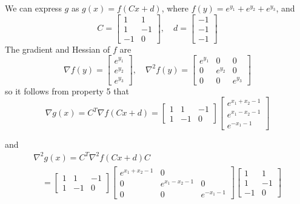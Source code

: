 \begin{example}
We can express $ g $ as $ g(x)=f(C x+d) $, where $ f(y)=e^{y_{1}}+e^{y_{2}}+e^{y_{3}} $, and
\begin{equation}
C=\left[\begin{array}{rr}
1 & 1 \\
1 & -1 \\
-1 & 0
\end{array}\right], \quad d=\left[\begin{array}{l}
-1 \\
-1 \\
-1
\end{array}\right]
\end{equation}
The gradient and Hessian of $ f $ are
\begin{equation}
\nabla f(y)=\left[\begin{array}{c}
e^{y_{1}} \\
e^{y_{2}} \\
e^{y_{3}}
\end{array}\right], \quad \nabla^{2} f(y)=\left[\begin{array}{ccc}
e^{y_{1}} & 0 & 0 \\
0 & e^{y_{2}} & 0 \\
0 & 0 & e^{y_{3}}
\end{array}\right]
\end{equation}
so it follows from property 5 that
\begin{equation}
\nabla g(x)=C^{T} \nabla f(C x+d)=\left[\begin{array}{rrr}
1 & 1 & -1 \\
1 & -1 & 0
\end{array}\right]\left[\begin{array}{c}
e^{x_{1}+x_{2}-1} \\
e^{x_{1}-x_{2}-1} \\
e^{-x_{1}-1}
\end{array}\right]
\end{equation}

and
\begin{equation}
\begin{array}{l}
\nabla^{2} g(x)=C^{T} \nabla^{2} f(C x+d) C \\
\quad=\left[\begin{array}{rrr}
1 & 1 & -1 \\
1 & -1 & 0
\end{array}\right]\left[\begin{array}{ccc}
e^{x_{1}+x_{2}-1} & 0 & \\
0 & e^{x_{1}-x_{2}-1} & 0 \\
0 & 0 & e^{-x_{1}-1}
\end{array}\right]\left[\begin{array}{rr}
1 & 1 \\
1 & -1 \\
-1 & 0
\end{array}\right]
\end{array}
\end{equation}
\end{example}

